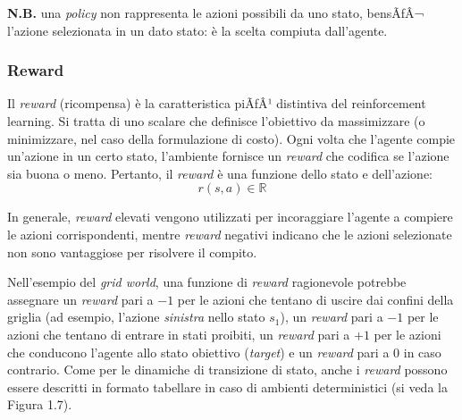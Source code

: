 ﻿\documentclass[11pt, a4paper]{report}
\begin{document}

\textbf{N.B.} una \emph{policy} non rappresenta le azioni possibili da uno stato, bensÃƒÂ¬ l'azione selezionata in un dato stato: è la scelta compiuta dall'agente.

\subsubsection{Reward}

Il \emph{reward} (ricompensa) è la caratteristica piÃƒÂ¹ distintiva del reinforcement learning. Si tratta di uno scalare che definisce l'obiettivo da massimizzare (o minimizzare, nel caso della formulazione di costo). Ogni volta che l'agente compie un'azione in un certo stato, l'ambiente fornisce un \emph{reward} che codifica se l'azione sia buona o meno. Pertanto, il \emph{reward} è una funzione dello stato e dell'azione:
\begin{equation}
r(s, a) \in \mathbb{R}
\end{equation}

In generale, \emph{reward} elevati vengono utilizzati per incoraggiare l'agente a compiere le azioni corrispondenti, mentre \emph{reward} negativi indicano che le azioni selezionate non sono vantaggiose per risolvere il compito.

Nell'esempio del \emph{grid world}, una funzione di \emph{reward} ragionevole potrebbe assegnare un \emph{reward} pari a $-1$ per le azioni che tentano di uscire dai confini della griglia (ad esempio, l'azione \emph{sinistra} nello stato $s_1$), un \emph{reward} pari a $-1$ per le azioni che tentano di entrare in stati proibiti, un \emph{reward} pari a $+1$ per le azioni che conducono l'agente allo stato obiettivo (\emph{target}) e un \emph{reward} pari a $0$ in caso contrario. Come per le dinamiche di transizione di stato, anche i \emph{reward} possono essere descritti in formato tabellare in caso di ambienti deterministici (si veda la Figura 1.7).

\newpage
\end{document}
